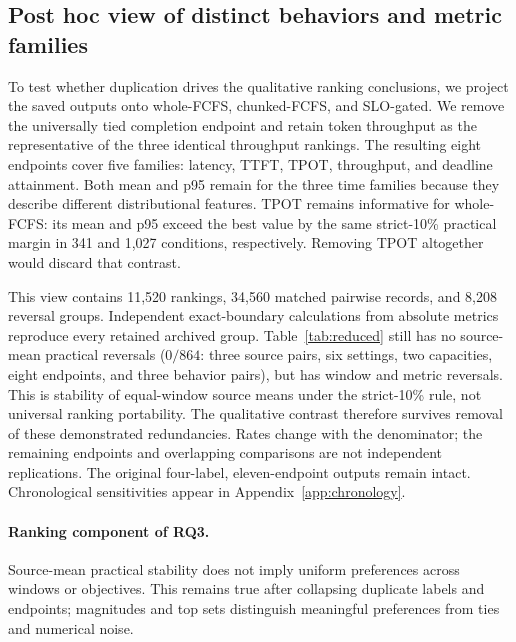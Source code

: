 \subsection{Post hoc view of distinct behaviors and metric families}
To test whether duplication drives the qualitative ranking conclusions,
we project the saved outputs onto whole-FCFS, chunked-FCFS, and SLO-gated.
We remove the universally tied completion endpoint and retain token
throughput as the representative of the three identical throughput rankings.
The resulting eight endpoints cover five families: latency, TTFT, TPOT,
throughput, and deadline attainment. Both mean and p95 remain for the three
time families because they describe different distributional features.
TPOT remains informative for whole-FCFS: its mean and p95 exceed the best
value by the same strict-10\% practical margin in 341 and 1,027 conditions,
respectively. Removing TPOT altogether would discard that contrast.

\begin{table}[t]
\centering\small
\caption{Post hoc reduced view: three behavior pairs and eight endpoints.
The original strict-10\% rule is unchanged. These dependent descriptive
counts supplement, rather than replace, Table~\ref{tab:reversals}.}
\label{tab:reduced}
\end{table}

This view contains 11,520 rankings, 34,560 matched pairwise records, and
8,208 reversal groups. Independent exact-boundary calculations from absolute
metrics reproduce every retained archived group. Table~\ref{tab:reduced}
still has no source-mean practical reversals ($0/864$: three source pairs,
six settings, two capacities, eight endpoints, and three behavior pairs),
but has window and metric reversals. This is stability of equal-window
source means under the strict-10\% rule, not universal ranking portability.
The qualitative contrast therefore survives removal of
these demonstrated redundancies. Rates change with the denominator;
the remaining endpoints and overlapping comparisons are not independent
replications. The original four-label, eleven-endpoint outputs remain intact.
Chronological sensitivities appear in Appendix~\ref{app:chronology}.

\paragraph{Ranking component of RQ3.}
Source-mean practical stability does not imply uniform preferences across
windows or objectives. This remains true after collapsing duplicate labels
and endpoints; magnitudes and top sets distinguish meaningful preferences
from ties and numerical noise.
